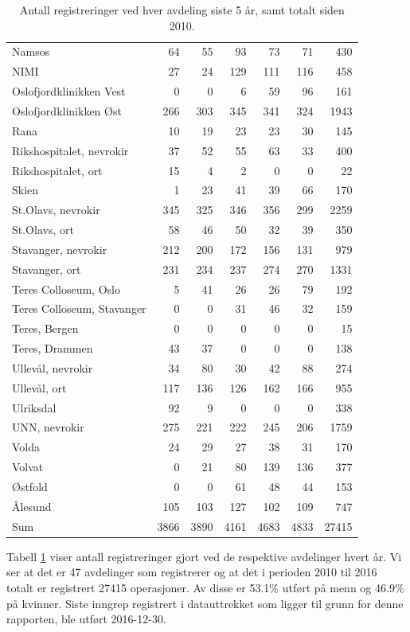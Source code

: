 \documentclass [norsk,a4paper,twoside]{article}\usepackage[]{graphicx}\usepackage[]{color}
\begin{document}
\begin{table}[ht]
\begin{tabular}{lrrrrrr}
  Namsos & 64 & 55 & 93 & 73 & 71 & 430 \\ 
  NIMI & 27 & 24 & 129 & 111 & 116 & 458 \\ 
  Oslofjordklinikken Vest & 0 & 0 & 6 & 59 & 96 & 161 \\ 
  Oslofjordklinikken Øst & 266 & 303 & 345 & 341 & 324 & 1943 \\ 
  Rana & 10 & 19 & 23 & 23 & 30 & 145 \\ 
  Rikshospitalet, nevrokir & 37 & 52 & 55 & 63 & 33 & 400 \\ 
  Rikshospitalet, ort & 15 & 4 & 2 & 0 & 0 & 22 \\ 
  Skien & 1 & 23 & 41 & 39 & 66 & 170 \\ 
  St.Olavs, nevrokir & 345 & 325 & 346 & 356 & 299 & 2259 \\ 
  St.Olavs, ort & 58 & 46 & 50 & 32 & 39 & 350 \\ 
  Stavanger, nevrokir & 212 & 200 & 172 & 156 & 131 & 979 \\ 
  Stavanger, ort & 231 & 234 & 237 & 274 & 270 & 1331 \\ 
  Teres Colloseum, Oslo & 5 & 41 & 26 & 26 & 79 & 192 \\ 
  Teres Colloseum, Stavanger & 0 & 0 & 31 & 46 & 32 & 159 \\ 
  Teres, Bergen & 0 & 0 & 0 & 0 & 0 & 15 \\ 
  Teres, Drammen & 43 & 37 & 0 & 0 & 0 & 138 \\ 
  Ullevål, nevrokir & 34 & 80 & 30 & 42 & 88 & 274 \\ 
  Ullevål, ort & 117 & 136 & 126 & 162 & 166 & 955 \\ 
  Ulriksdal & 92 & 9 & 0 & 0 & 0 & 338 \\ 
  UNN, nevrokir & 275 & 221 & 222 & 245 & 206 & 1759 \\ 
  Volda & 24 & 29 & 27 & 38 & 31 & 170 \\ 
  Volvat & 0 & 21 & 80 & 139 & 136 & 377 \\ 
  Østfold & 0 & 0 & 61 & 48 & 44 & 153 \\ 
  Ålesund & 105 & 103 & 127 & 102 & 109 & 747 \\ 
  Sum & 3866 & 3890 & 4161 & 4683 & 4833 & 27415 \\ 
   \hline
\end{tabular}
\caption{Antall registreringer ved hver avdeling siste 5 år, samt totalt siden 2010.} 
\label{tab:AntReg}
\end{table}


Tabell \ref{tab:AntReg} viser antall 
registreringer gjort ved de respektive avdelinger hvert år. Vi ser at det er  
47 avdelinger som registrerer og at det i perioden 2010 til 2016 totalt er registrert 27415 
operasjoner. Av disse er 53.1\% utført på menn og 46.9\% på kvinner.
Siste inngrep registrert i datauttrekket som ligger til grunn for denne rapporten, ble utført 
2016-12-30. 
\par 
\clearpage
\end{document}
